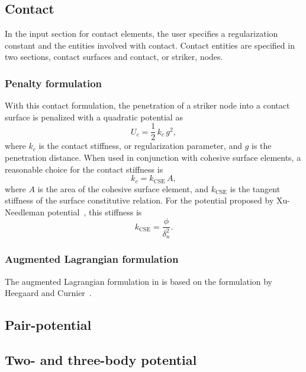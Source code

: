 \subsection{Contact}
In the input section for contact elements, the user
specifies a regularization constant and the entities involved with 
contact. Contact entities are specified in two sections, contact 
surfaces and contact, or striker, nodes.
\subsubsection{Penalty formulation}
With this contact formulation, the penetration of a striker node into a 
contact surface is penalized with a quadratic potential as
\begin{equation}
U_{c}= \frac{1}{2}\,k_{c}\,g^{2},
\end{equation}
where $k_{c}$ is the contact stiffness, or regularization parameter,
and $g$ is the penetration 
distance. When used in conjunction with cohesive surface elements, a 
reasonable choice for the contact stiffness is
\begin{equation}
k_{c}=k_{\text{CSE}}\,A,
\end{equation}
where $A$ is the area of the cohesive surface element, and 
$k_{\text{CSE}}$ is the tangent stiffness of the surface 
constitutive relation. For the potential proposed by 
Xu-Needleman potential~\cite{eq.XN.1},
this stiffness is
\begin{equation}
k_{\text{CSE}} = \frac{\phi}{\delta_{n}^{2}}.
\end{equation}

\subsubsection{Augmented Lagrangian formulation}
The augmented Lagrangian formulation in \tahoe is based on the 
formulation by Heegaard and Curnier~\cite{Heegaard1993}.
\subsection{Pair-potential}

\subsection{Two- and three-body potential}

